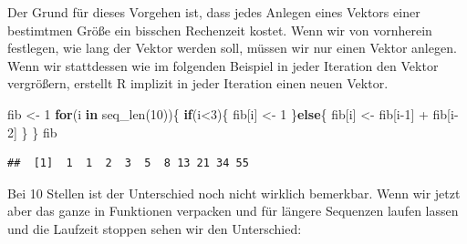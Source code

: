 \documentclass[
]{book}
\newenvironment{Shaded}{\begin{snugshade}}{\end{snugshade}}
\newcommand{\ControlFlowTok}[1]{\textcolor[rgb]{0.13,0.29,0.53}{\textbf{#1}}}
\newcommand{\DecValTok}[1]{\textcolor[rgb]{0.00,0.00,0.81}{#1}}
\newcommand{\FunctionTok}[1]{\textcolor[rgb]{0.00,0.00,0.00}{#1}}
\newcommand{\NormalTok}[1]{#1}
\newcommand{\OtherTok}[1]{\textcolor[rgb]{0.56,0.35,0.01}{#1}}
\newcommand{\SpecialCharTok}[1]{\textcolor[rgb]{0.00,0.00,0.00}{#1}}
\begin{document}
Der Grund für dieses Vorgehen ist, dass jedes Anlegen eines Vektors einer bestimtmen Größe ein bisschen Rechenzeit kostet. Wenn wir von vornherein festlegen, wie lang der Vektor werden soll, müssen wir nur einen Vektor anlegen. Wenn wir stattdessen wie im folgenden Beispiel in jeder Iteration den Vektor vergrößern, erstellt R implizit in jeder Iteration einen neuen Vektor.

\begin{Shaded}
\begin{Highlighting}[]
\NormalTok{fib }\OtherTok{\textless{}{-}} \DecValTok{1}
\ControlFlowTok{for}\NormalTok{(i }\ControlFlowTok{in} \FunctionTok{seq\_len}\NormalTok{(}\DecValTok{10}\NormalTok{))\{}
  \ControlFlowTok{if}\NormalTok{(i}\SpecialCharTok{\textless{}}\DecValTok{3}\NormalTok{)\{ }
\NormalTok{    fib[i] }\OtherTok{\textless{}{-}} \DecValTok{1}
\NormalTok{  \}}\ControlFlowTok{else}\NormalTok{\{}
\NormalTok{    fib[i] }\OtherTok{\textless{}{-}}\NormalTok{ fib[i}\DecValTok{{-}1}\NormalTok{] }\SpecialCharTok{+}\NormalTok{ fib[i}\DecValTok{{-}2}\NormalTok{] }
\NormalTok{  \}}
\NormalTok{\}}
\NormalTok{fib}
\end{Highlighting}
\end{Shaded}

\begin{verbatim}
##  [1]  1  1  2  3  5  8 13 21 34 55
\end{verbatim}

Bei 10 Stellen ist der Unterschied noch nicht wirklich bemerkbar. Wenn wir jetzt aber das ganze in Funktionen verpacken und für längere Sequenzen laufen lassen und die Laufzeit stoppen sehen wir den Unterschied:
\end{document}

